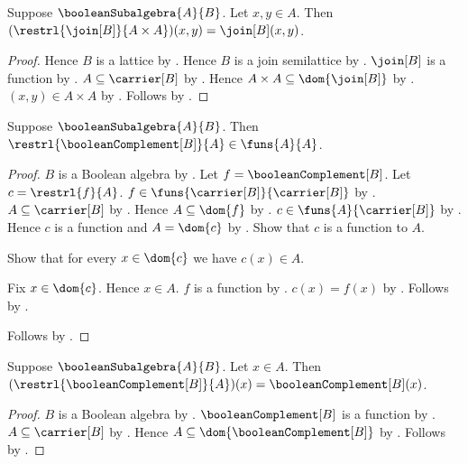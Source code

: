 \begin{proposition}\label{boolean_subalgebra_join_restriction_apply}
    Suppose $\booleanSubalgebra{A}{B}$.
    Let $x,y\in A$.
    Then $(\restrl{\join[B]}{A\times A})(x,y)=\join[B](x,y)$.
\end{proposition}
\begin{proof}
    Hence $B$ is a lattice by .
    Hence $B$ is a join semilattice by
        .
    $\join[B]$ is a function by .
    $A\subseteq\carrier[B]$ by .
    Hence $A\times A\subseteq\dom{\join[B]}$ by
        .
    $(x,y)\in A\times A$ by .
    Follows by .
\end{proof}

\begin{proposition}\label{boolean_subalgebra_complement_restriction_type}
    Suppose $\booleanSubalgebra{A}{B}$.
    Then $\restrl{\booleanComplement[B]}{A}\in\funs{A}{A}$.
\end{proposition}
\begin{proof}
    $B$ is a Boolean algebra by .
    Let $f=\booleanComplement[B]$.
    Let $c=\restrl{f}{A}$.
    $f\in\funs{\carrier[B]}{\carrier[B]}$ by
        .
    $A\subseteq\carrier[B]$ by .
    Hence $A\subseteq\dom{f}$ by .
    $c\in\funs{A}{\carrier[B]}$ by .
    Hence $c$ is a function and $A=\dom{c}$ by .
    Show that $c$ is a function to $A$.
    \begin{subproof}
        Show that for every $x\in\dom{c}$ we have $c(x)\in A$.
        \begin{subproof}
            Fix $x\in\dom{c}$.
            Hence $x\in A$.
            $f$ is a function by .
            $c(x)=f(x)$ by .
            Follows by .
        \end{subproof}
    \end{subproof}
    Follows by .
\end{proof}

\begin{proposition}\label{boolean_subalgebra_complement_restriction_apply}
    Suppose $\booleanSubalgebra{A}{B}$.
    Let $x\in A$.
    Then $(\restrl{\booleanComplement[B]}{A})(x)
        =\booleanComplement[B](x)$.
\end{proposition}
\begin{proof}
    $B$ is a Boolean algebra by .
    $\booleanComplement[B]$ is a function by
        .
    $A\subseteq\carrier[B]$ by .
    Hence $A\subseteq\dom{\booleanComplement[B]}$ by
        .
    Follows by .
\end{proof}

